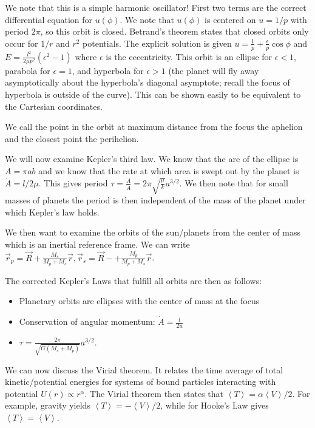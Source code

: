 \documentclass[10pt]{report}
\newcommand{\expvalue}[1]{\left<#1\right>}
\begin{document}
We note that this is a simple harmonic oscillator! First two terms are the correct differential equation for $u(\phi)$. We note that $u(\phi)$ is centered on $u=1/p$ with period $2\pi$, so this orbit is closed. Betrand's theorem states that closed orbits only occur for $1/r$ and $r^2$ potentials. The explicit solution is given $u=\frac{1}{p} + \frac{\epsilon}{p}\cos \phi$ and $E = \frac{l^2}{2\mu p^2}(\epsilon^2 - 1)$ where $\epsilon$ is the eccentricity. This orbit is an ellipse for $\epsilon < 1$, parabola for $\epsilon = 1$, and hyperbola for $\epsilon > 1$ (the planet will fly away asymptotically about the hyperbola's diagonal asymptote; recall the focus of hyperbola is outside of the curve). This can be shown easily to be equivalent to the Cartesian coordinates. 

We call the point in the orbit at maximum distance from the focus the aphelion and the closest point the perihelion. 

We will now examine Kepler's third law. We know that the are of the ellipse is $A=\pi ab$ and we know that the rate at which area is swept out by the planet is $\dot{A} = l/2\mu$. This gives period $\tau = \frac{A}{\dot{A}} = 2\pi\sqrt{\frac{\mu}{k}}a^{3/2}$. We then note that for small masses of planets the period is then independent of the mass of the planet under which Kepler's law holds.

We then want to examine the orbits of the sun/planets from the center of mass which is an inertial reference frame. We can write $\vec{r}_p = \vec{R} + \frac{M_s}{M_p + M_s} \vec{r}, \vec{r}_s = \vec{R} - + \frac{M_p}{M_p + M_s} \vec{r}$. 

The corrected Kepler's Laws that fulfill all orbits are then as follows:
\begin{itemize}
    \item Planetary orbits are ellipses with the center of mass at the focus
    \item Conservation of angular momentum: $\dot{A} = \frac{l}{2u}$
    \item $\tau=\frac{2\pi}{\sqrt{G(M_s + M_p)}}a^{3/2}$. 
\end{itemize}

We can now discuss the Virial theorem. It relates the time average of total kinetic/potential energies for systems of bound particles interacting with potential $U(r) \propto r^\alpha$. The Virial theorem then states that $\expvalue{T} = \alpha\expvalue{V}/2$. For example, gravity yields $\expvalue{T}=-\expvalue{V}/2$, while for Hooke's Law gives $\expvalue{T}=\expvalue{V}$.
\end{document}
